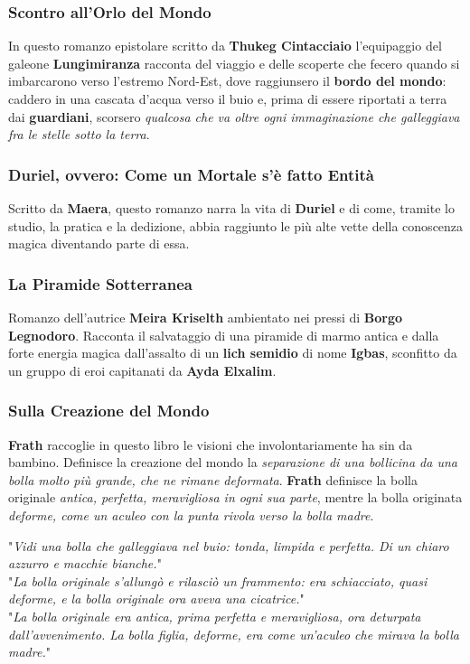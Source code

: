 \documentclass[10pt,twoside,onecolumn,openany]{book}
\begin{document}
\subsubsection{Scontro all'Orlo del Mondo} In questo romanzo epistolare scritto da \textbf{Thukeg Cintacciaio} l'equipaggio del galeone \textbf{Lungimiranza} racconta del viaggio e delle scoperte che fecero quando si imbarcarono verso l'estremo Nord-Est, dove raggiunsero il \textbf{bordo del mondo}: caddero in una cascata d'acqua verso il buio e, prima di essere riportati a terra dai \textbf{guardiani}, scorsero \textit{qualcosa che va oltre ogni immaginazione che galleggiava fra le stelle sotto la terra}.
\subsubsection{Duriel, ovvero: Come un Mortale s'è fatto Entità} Scritto da \textbf{Maera}, questo romanzo narra la vita di \textbf{Duriel} e di come, tramite lo studio, la pratica e la dedizione, abbia raggiunto le più alte vette della conoscenza magica diventando parte di essa.
\subsubsection{La Piramide Sotterranea} Romanzo dell'autrice \textbf{Meira Kriselth} ambientato nei pressi di \textbf{Borgo Legnodoro}. Racconta il salvataggio di una piramide di marmo antica e dalla forte energia magica dall'assalto di un \textbf{lich semidio} di nome \textbf{Igbas}, sconfitto da un gruppo di eroi capitanati da \textbf{Ayda Elxalim}.
\subsubsection{Sulla Creazione del Mondo} \textbf{Frath} raccoglie in questo libro le visioni che involontariamente ha sin da bambino. Definisce la creazione del mondo la \textit{separazione di una bollicina da una bolla molto più grande, che ne rimane deformata}. \textbf{Frath} definisce la bolla originale \textit{antica, perfetta, meravigliosa in ogni sua parte}, mentre la bolla originata \textit{deforme, come un aculeo con la punta rivola verso la bolla madre}.
\begin{quotebox}
"\textit{Vidi una bolla che galleggiava nel buio: tonda, limpida e perfetta. Di un chiaro azzurro e macchie bianche.}"\\
"\textit{La bolla originale s'allungò e rilasciò un frammento: era schiacciato, quasi deforme, e la bolla originale ora aveva una cicatrice.}"\\
"\textit{La bolla originale era antica, prima perfetta e meravigliosa, ora deturpata dall'avvenimento. La bolla figlia, deforme, era come un'aculeo che mirava la bolla madre.}"
\end{quotebox}
\end{document}

